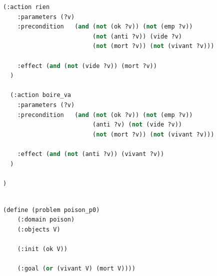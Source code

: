 \begin{lstlisting}[language=Lisp,basicstyle=\ttfamily\footnotesize]
  (:action rien
    :parameters (?v)
    :precondition   (and (not (ok ?v)) (not (emp ?v)) 
                         (not (anti ?v)) (vide ?v) 
                         (not (mort ?v)) (not (vivant ?v)))

    :effect (and (not (vide ?v)) (mort ?v))
  )

  (:action boire_va
    :parameters (?v)
    :precondition   (and (not (ok ?v)) (not (emp ?v)) 
                         (anti ?v) (not (vide ?v)) 
                         (not (mort ?v)) (not (vivant ?v)))

    :effect (and (not (anti ?v)) (vivant ?v))
  )

)


    \end{lstlisting}


\begin{lstlisting}[language=Lisp,basicstyle=\ttfamily\footnotesize]

(define (problem poison_p0)
    (:domain poison)
    (:objects V)
        
    (:init (ok V))

    (:goal (or (vivant V) (mort V))))

    \end{lstlisting}